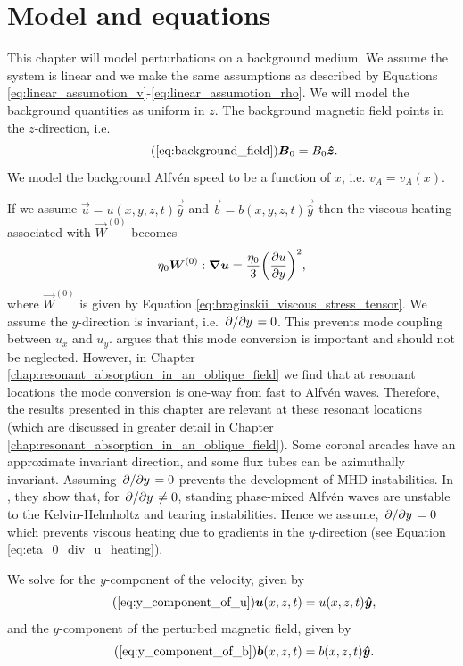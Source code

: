 \section{Model and equations}

This chapter will model perturbations on a background medium. We assume the system is linear and we make the same assumptions as described by Equations \eqref{eq:linear_assumotion_v}-\eqref{eq:linear_assumotion_rho}. We will model the background quantities as uniform in $z$. The background magnetic field points in the $z$-direction, i.e.
\begin{equation}
    \tag{\ref{eq:background_field}}
    \vec{B}_0 = B_0\vec{\hat{z}}.
\end{equation}
We model the background Alfv\'en speed to be a function of $x$, i.e. $v_A=v_A(x)$.

If we assume $\vec{u}=u(x,y,z,t)\vec{\hat{y}}$ and $\vec{b}=b(x,y,z,t)\vec{\hat{y}}$ then the viscous heating associated with $\vec{W}^{(0)}$ becomes
\begin{equation}
    \label{eq:eta_0_div_u_heating}
    \eta_0 \boldsymbol{W}^{(0)}:\grad{\boldsymbol{u}} = \frac{\eta_0}{3}\qty(\pdv{u}{y})^2,
\end{equation}
where $\vec{W}^{(0)}$ is given by Equation \eqref{eq:braginskii_viscous_stress_tensor}. We assume the $y$-direction is invariant, i.e. $\pdv*{}{y}=0$. This prevents mode coupling between $u_x$ and $u_y$. \citet{Parker1991} argues that this mode conversion is important and should not be neglected. However, in Chapter \ref{chap:resonant_absorption_in_an_oblique_field} we find that at resonant locations the mode conversion is one-way from fast to Alfv\'en waves. Therefore, the results presented in this chapter are relevant at these resonant locations (which are discussed in greater detail in Chapter \ref{chap:resonant_absorption_in_an_oblique_field}). Some coronal arcades have an approximate invariant direction, and some flux tubes can be azimuthally invariant. Assuming $\pdv*{}{y}=0$ prevents the development of MHD instabilities. In \citet{Heyvaerts1983}, they show that, for $\pdv*{}{y}\ne0$, standing phase-mixed Alfv\'en waves are unstable to the Kelvin-Helmholtz and tearing instabilities. Hence we assume, $\pdv*{}{y}=0$ which prevents viscous heating due to gradients in the $y$-direction (see Equation \ref{eq:eta_0_div_u_heating}).

We solve for the $y$-component of the velocity, given by
\begin{equation}
    \tag{\ref{eq:y_component_of_u}}
    \vec{u}(x,z,t) = u(x,z,t)\vec{\hat{y}},
\end{equation}
and the $y$-component of the perturbed magnetic field, given by
\begin{equation}
    \tag{\ref{eq:y_component_of_b}}
    \vec{b}(x,z,t) = b(x,z,t)\vec{\hat{y}}.
\end{equation}

